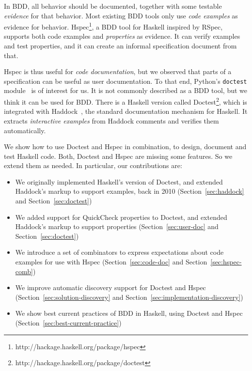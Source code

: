 \documentclass[preprint]{sigplanconf}
\begin{document}
In BDD, all behavior should be documented, together with some testable
\emph{evidence} for that behavior.  Most existing BDD tools only use
\emph{code examples} as evidence for behavior.
Hspec\footnote{%
http://hackage.haskell.org/package/hspec},
a BDD tool for Haskell inspired by RSpec, supports
both code examples and \emph{properties} as evidence.
It can verify examples and test properties, and it can create an
informal specification document from that.

Hspec is thus useful for \emph{code documentation}, but we observed that parts
of a specification can be useful as user documentation. To that end,
Python's {\tt doctest} module~\cite{doctest} is of interest for us.
It is not commonly described as a BDD tool, but we think it can be
used for BDD.
There is a Haskell version called Doctest\footnote{%
http://hackage.haskell.org/package/doctest}, which is integrated with Haddock~\cite{haddock},
the standard documentation mechanism for Haskell.
It extracts \emph{interactive examples} from Haddock comments and
verifies them automatically.

We show how to use Doctest and Hspec in combination, to design,
document and test Haskell code.  Both, Doctest and Hspec are missing
some features.  So we extend them as needed.  In particular, our
contributions are:

\begin{itemize}
\item
    We originally implemented Haskell's version of Doctest, and
    extended Haddock's markup to support examples, back in 2010
    (Section~\ref{sec:haddock} and Section~\ref{sec:doctest})
\item
    We added support for QuickCheck properties to Doctest, and extended
    Haddock's markup to support properties
    (Section~\ref{sec:user-doc} and Section~\ref{sec:doctest})

\item
    We introduce a set of combinators to express expectations about
    code examples for use with Hspec
    (Section~\ref{sec:code-doc} and Section~\ref{sec:hspec-comb})

\item
    We improve automatic discovery support for Doctest and Hspec
    (Section~\ref{sec:solution-discovery} and Section~\ref{sec:implementation-discovery})

\item
    We show best current practices of BDD in Haskell, using Doctest
    and Hspec (Section~\ref{sec:best-current-practice})

\end{itemize}
\end{document}
